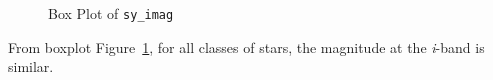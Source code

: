 \documentclass[
  letterpaper,
  DIV=11,
  numbers=noendperiod]{scrartcl}
\begin{document}
\begin{longtable}[]
\end{longtable}

\begin{figure}[H]


\caption{\label{fig-sy-imag}Box Plot of \texttt{sy\_imag}}

\end{figure}%

From boxplot Figure~\ref{fig-sy-imag}, for all classes of stars, the
magnitude at the \emph{i}-band is similar.
\end{document}
